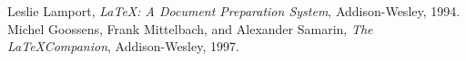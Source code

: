 \renewcommand{\refname}{Further Readings} %
\begin{thebibliography}{9} %
  Leslie Lamport, \emph{\LaTeX: A Document Preparation System}, Addison-Wesley, 1994.
  Michel Goossens, Frank Mittelbach, and Alexander Samarin, \emph{The \LaTeX Companion}, Addison-Wesley, 1997.
  \nocite{goossens1997latex} %
  \nocite{lamport1994latex} %
\end{thebibliography}

\renewcommand{\refname}{Reference s}  %
